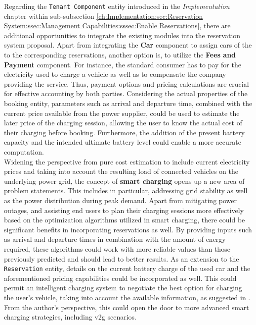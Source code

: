 Regarding the \texttt{Tenant Component} entity introduced in the \textit{Implementation} chapter within sub-subsection \ref{ch:Implementation:sec:Reservation System:ssec:Management Capabilities:sssec:Enable Reservations}, there are additional opportunities to integrate the existing modules into the reservation system proposal. 
Apart from integrating the \textbf{Car} component to assign cars of the  to the corresponding reservations, another option is, to utilize the \textbf{Fees and Payment} component.
For instance, the standard consumer has to pay for the electricity used to charge a vehicle as well as to compensate the company providing the service. Thus, payment options and pricing calculations are crucial for effective accounting by both parties. 
Considering the actual properties of the booking entity, parameters such as arrival and departure time, combined with the current price available from the power supplier, could be used to estimate the later price of the charging session, allowing the user to know the actual cost of their charging before booking.
Furthermore, the addition of the present battery capacity and the intended ultimate battery level could enable a more accurate computation. \\
Widening the perspective from pure cost estimation to include current electricity prices and taking into account the resulting load of connected vehicles on the underlying power grid, the concept of \textbf{smart charging} opens up a new area of problem statements. This includes in particular, addressing grid stability as well as the power distribution during peak demand.
Apart from mitigating power outages, and assisting end users to plan their charging sessions more effectively based on the optimization algorithms utilized in smart charging, there could be significant benefits in incorporating reservations as well.
By providing inputs such as arrival and departure times in combination with the amount of energy required, these algorithms could work with more reliable values than those previously predicted and should lead to better results.
As an extension to the \texttt{Reservation} entity, details on the current battery charge of the used car and the aforementioned pricing capabilities could be incorporated as well. 
This could permit an intelligent charging system to negotiate the best option for charging the user's vehicle, taking into account the available information, as suggested in \cite{orcioni_ev_2020}.
From the author's perspective, this could open the door to more advanced smart charging strategies, including \acrshort{v2g} scenarios. \\

